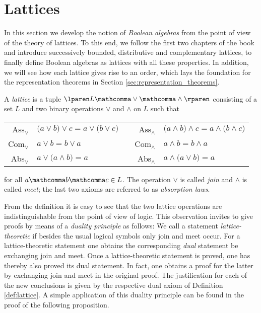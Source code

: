 \section{Lattices}
\label{sec:lattices}

In this section we develop the notion of \emph{Boolean algebras}
from the point of view of the theory of lattices.
To this end, we follow the first two chapters of the book
 \cite{hermes:verbandstheorie-2}
and introduce successively bounded, distributive and complementary lattices,
to finally define Boolean algebras as lattices with all these properties.
In addition, we will see how each lattice gives rise to an order,
which lays the foundation for the representation theorems in
Section \ref{sec:representation_theorems}.

\medskip

\begin{definition}
\label{def:lattice}
  A \emph{lattice} is a tuple
  $\lparen L \mathcomma \vee \mathcomma \wedge \rparen$
  consisting of a set $L$ and two binary operations $\vee$ and $\wedge$ on $L$
  such that

  \begin{table}[h]
  \centering
    \begin{tabular}{rlcrl}
    Ass$_\vee$
    & $\lparen a \vee b \rparen \vee c \equal a \vee \lparen b \vee c \rparen$
    & \quad
    & Ass$_\wedge$
    & $\lparen a \wedge b \rparen \wedge c
      \equal a \wedge \lparen b \wedge c \rparen$ \\
    Com$_\vee$
    & $a \vee b \equal b \vee a$
    & \quad
    & Com$_\wedge$
    & $a \wedge b \equal b \wedge a$ \\
    Abs$_\vee$
    & $a \vee \lparen a \wedge b \rparen \equal a$
    & \quad
    & Abs$_\wedge$
    & $a \wedge \lparen a \vee b \rparen \equal a$ \\
    \end{tabular}
  \end{table}

  \noindent for all $a \mathcomma b \mathcomma c \in L$.
  The operation $\vee$ is called \emph{join} and $\wedge$ is called \emph{meet};
  the last two axioms are referred to as \emph{absorption laws}.
\end{definition}

\medskip

From the definition it is easy to see that the two lattice operations
are indistinguishable from the point of view of logic.
This observation invites to give proofs by means of a \emph{duality principle}
as follows:
We call a statement \emph{lattice-theoretic}
if besides the usual logical symbols only join and meet occur.
For a lattice-theoretic statement
one obtains the corresponding \emph{dual} statement
be exchanging join and meet.
Once a lattice-theoretic statement is proved,
one has thereby also proved its dual statement.
In fact, one obtains a proof for the latter
by exchanging join and meet in the original proof.
The justification for each of the new conclusions
is given by the respective dual axiom of Definition \ref{def:lattice}.
A simple application of this duality principle can be found
in the proof of the following proposition.

